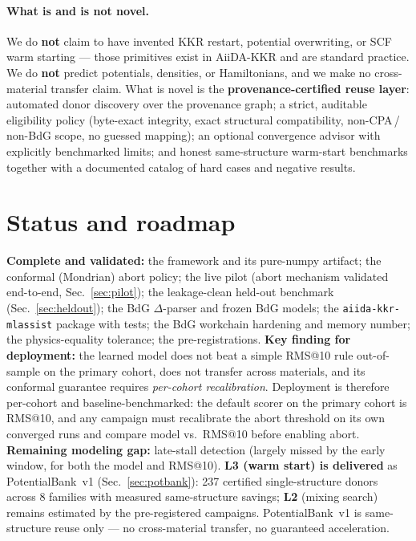 \documentclass[11pt]{article}
\newcommand{\code}[1]{\texttt{#1}}
\begin{document}
\paragraph{What is and is not novel.} We do \textbf{not} claim to have invented KKR restart, potential
overwriting, or SCF warm starting --- those primitives exist in AiiDA-KKR and are standard practice. We do
\textbf{not} predict potentials, densities, or Hamiltonians, and we make no cross-material transfer claim. What
is novel is the \textbf{provenance-certified reuse layer}: automated donor discovery over the provenance graph;
a strict, auditable eligibility policy (byte-exact integrity, exact structural compatibility, non-CPA\,/\,non-BdG
scope, no guessed mapping); an optional convergence advisor with explicitly benchmarked limits; and honest
same-structure warm-start benchmarks together with a documented catalog of hard cases and negative results.

\section{Status and roadmap}
\label{sec:status}
\textbf{Complete and validated:} the framework and its pure-numpy artifact; the conformal (Mondrian)
abort policy; the live pilot (abort mechanism validated end-to-end, Sec.~\ref{sec:pilot}); the
leakage-clean held-out benchmark (Sec.~\ref{sec:heldout}); the BdG $\Delta$-parser and frozen BdG models;
the \code{aiida-kkr-mlassist} package with tests; the BdG workchain hardening and memory number; the
physics-equality tolerance; the pre-registrations.
\textbf{Key finding for deployment:} the learned model does not beat a simple RMS@10 rule out-of-sample on
the primary cohort, does not transfer across materials, and its conformal guarantee requires
\emph{per-cohort recalibration}. Deployment is therefore per-cohort and baseline-benchmarked: the default
scorer on the primary cohort is RMS@10, and any campaign must recalibrate the abort threshold on its own
converged runs and compare model vs.\ RMS@10 before enabling abort.
\textbf{Remaining modeling gap:} late-stall detection (largely missed by the early window, for both the
model and RMS@10). \textbf{L3 (warm start) is delivered} as PotentialBank~v1 (Sec.~\ref{sec:potbank}): 237
certified single-structure donors across 8 families with measured same-structure savings; \textbf{L2}
(mixing search) remains estimated by the pre-registered campaigns. PotentialBank~v1 is same-structure reuse
only --- no cross-material transfer, no guaranteed acceleration.
\end{document}
